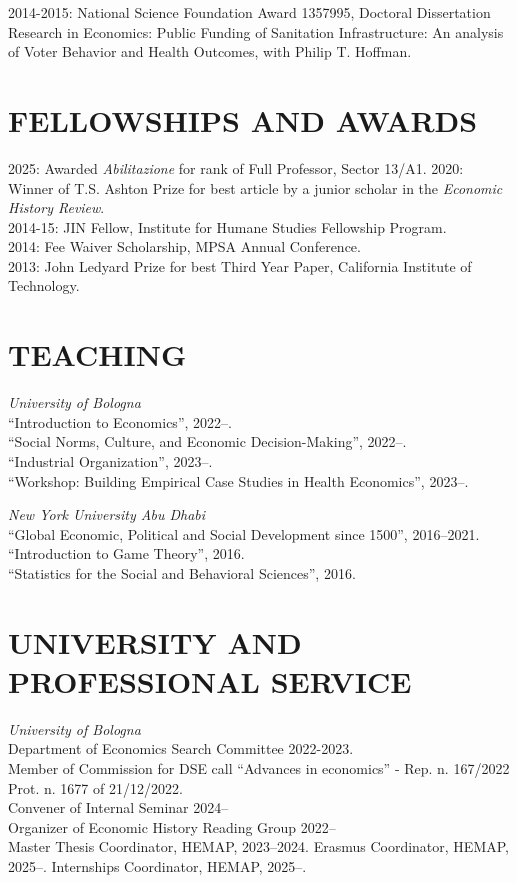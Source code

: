 \documentclass{res}  %
\begin{document}
\begin{resume}
2014-2015: National Science Foundation Award 1357995, Doctoral Dissertation Research in Economics: Public Funding of Sanitation Infrastructure: An analysis of Voter Behavior and Health Outcomes, with Philip T. Hoffman.

\section{FELLOWSHIPS AND AWARDS}
2025: Awarded \textit{Abilitazione} for rank of Full Professor, Sector 13/A1.
2020: Winner of T.S. Ashton Prize for best article by a junior scholar in the \textit{Economic History Review}.\\
2014-15: JIN Fellow, Institute for Humane Studies Fellowship Program. \\
2014: Fee Waiver Scholarship, MPSA Annual Conference. \\
2013: John Ledyard Prize for best Third Year Paper, California Institute of Technology. 


\newpage

\section{TEACHING}
\textit{University of Bologna} \\
``Introduction to Economics'', 2022--. \\
``Social Norms, Culture, and Economic Decision-Making'', 2022--. \\
``Industrial Organization'', 2023--. \\
``Workshop: Building Empirical Case Studies in Health Economics'', 2023--.

\textit{New York University Abu Dhabi} \\
``Global Economic, Political and Social Development since 1500'', 2016--2021. \\
``Introduction to Game Theory'', 2016. \\
``Statistics for the Social and Behavioral Sciences'', 2016.

\section{UNIVERSITY AND PROFESSIONAL SERVICE}
\textit{University of Bologna} \\
Department of Economics Search Committee 2022-2023. \\
Member of Commission for DSE call ``Advances in economics'' - Rep. n. 167/2022 Prot. n. 1677 of 21/12/2022. \\
Convener of Internal Seminar 2024-- \\
Organizer of Economic History Reading Group 2022-- \\
Master Thesis Coordinator, HEMAP, 2023--2024. 
Erasmus Coordinator, HEMAP, 2025--.
Internships Coordinator, HEMAP, 2025--.


\end{resume}
\end{document}
